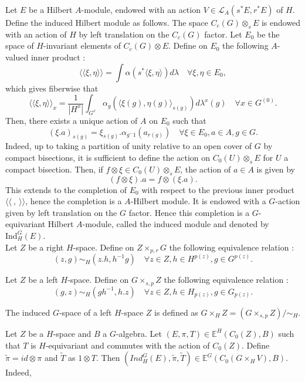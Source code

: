 Let $E$ be a Hilbert $A$-module, endowed with an action $V\in\mathcal L_A(s^*E,r^*E)$ of $H$. Define the induced Hilbert module as follows. The space $C_c(G)\otimes_s E$ is endowed with an action of $H$ by left translation on the $C_c(G)$ factor.  Let $E_0$ be the space of $H$-invariant elements of $C_c(G)\otimes E$. Define on $E_0$ the following $A$-valued inner product :
\[\langle\langle \xi, \eta\rangle\rangle = \int \alpha(s^*\langle \xi,\eta\rangle)d\lambda \quad \forall \xi,\eta\in E_0, \]
which gives fiberwise that 
\[\langle\langle \xi, \eta\rangle\rangle_x = \frac{1}{|H^x|}\int_{G^x} \alpha_g(\langle \xi (g),\eta (g)\rangle_{s(g)})d\lambda^x(g)\quad \forall x\in G^{(0)}.\]
Then, there exists a unique action of $A$ on $E_0$ such that 
\[(\xi .a)_{s(g)} = \xi_{s(g)}.\alpha_{g^-1}(a_{r(g)}) \quad \forall \xi \in E_0, a\in A,g\in G.\]
Indeed, up to taking a partition of unity relative to an open cover of $G$ by compact bisections, it is sufficient to define the action on $C_0(U)\otimes_s E $ for $U$ a compact bisection. Then, if $f\otimes \xi \in C_0(U)\otimes_s E $, the action of $a\in A$ is given by 
\[(f\otimes \xi ) . a = f\otimes (\xi.a ).  \]
This extends to the completion of $E_0$ with respect to the previous inner product $\langle\langle \ , \ \rangle\rangle$, hence the completion is a $A$-Hilbert module. It is endowed with a $G$-action given by left translation on the $G$ factor. Hence this completion is a $G$-equivariant Hilbert $A$-module, called the induced module and denoted by $\text{Ind}_H^G (E)$.\\  

Let $Z$ be a right $H$-space. Define on $Z\times_{p,r} G$ the following equivalence relation :
\[(z,g)\sim_H (z.h, h^{-1}g)\quad \forall z\in Z, h\in H^{p(z)},g\in G^{p(z)}.\]

Let $Z$ be a left $H$-space. Define on $G \times_{s,p} Z $ the following equivalence relation :
\[(g,z)\sim_H (gh^{-1}, h.z)\quad \forall z\in Z, h\in H_{p(z)},g\in G_{p(z)}.\]

\begin{definition}
The induced $G$-space of a left $H$-space $Z$ is defined as $ G\times_H Z = (G \times_{s,p} Z) / \sim_H$. 
\end{definition}


Let $Z$ be a $H$-space and $B$ a $G$-algebra. Let $(E,\pi,T)\in \mathbb E^H(C_0(Z),B)$ such that $T$ is $H$-equivariant and commutes with the action of $C_0(Z)$. Define $\tilde\pi = id\otimes \pi$ and $\tilde T$ as $1\otimes T$. Then $(Ind_H^G (E), \tilde \pi, \tilde T)\in \mathbb E^G(C_0(G\times_H V),B)$. Indeed, \\

